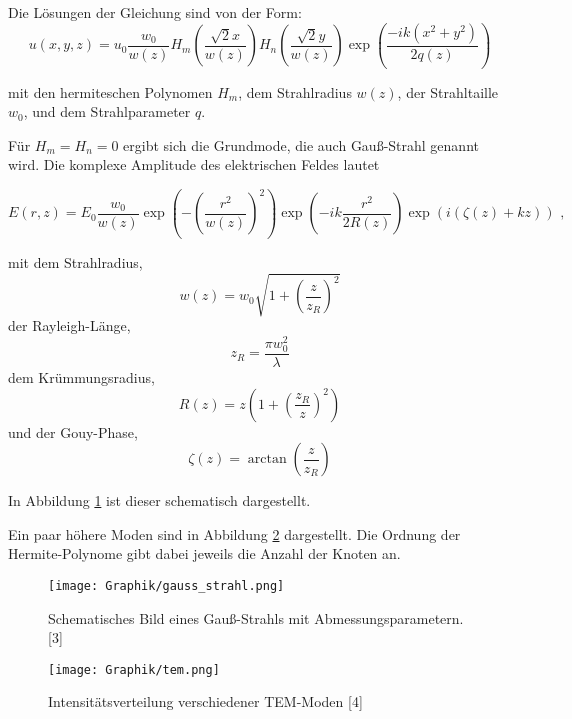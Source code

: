 \documentclass[10pt,twoside]{article}
\renewcommand{\1}{^{-1}}
\renewcommand{\2}{^{-2}}
\newcommand{\3}{^{-3}}
\newcommand{\4}{^{-4}}
\newcommand{\5}{^{-5}}
\newcommand{\6}{^{-6}}
\newcommand{\7}{^{-7}}
\newcommand{\8}{^{-8}}
\newcommand{\9}{^{-9}}
\begin{document}
Die Lösungen der Gleichung sind von der Form:
\begin{equation}
u(x,y,z)=u_0 \frac{w_0}{w(z)} H_m \left( \frac{\sqrt{2}x}{w(z)} \right) H_n \left( \frac{\sqrt{2}y}{w(z)} \right) \exp \left( \frac{-ik(x^2+y^2)}{2q(z)} \right)
\end{equation}

mit den hermiteschen Polynomen $H_m$, dem Strahlradius $w(z)$, der Strahltaille $w_0$, und dem Strahlparameter $q$.

Für $H_m = H_n = 0$ ergibt sich die Grundmode, die auch Gauß-Strahl genannt wird.
Die komplexe Amplitude des elektrischen Feldes lautet

\begin{equation}
E(r,z)= E_0 \frac{w_0}{w(z)} \exp \left( -\left(\frac{r^2}{w(z)} \right) ^2 \right) \exp \left( -ik \frac{r^2}{2R(z)} \right) \exp \left( i( \zeta (z) + kz ) \right) \, \, ,
\end{equation}

mit dem Strahlradius,
\begin{equation}
w(z)= w_0 \sqrt{1+ \left( \frac{z}{z_R} \right) ^2}
\end{equation}
der Rayleigh-Länge,
\begin{equation}
z_R=\frac{\pi w_0^2}{\lambda}
\end{equation}
dem Krümmungsradius,
\begin{equation}
R(z)=z \left( 1 +\left( \frac{z_R}{z} \right) ^2 \right)
\end{equation}
und der Gouy-Phase,
\begin{equation}
\zeta(z) = \arctan \left( \frac{z}{z_R} \right)
\end{equation}

In Abbildung \ref{fig:gauss} ist dieser schematisch dargestellt.


Ein paar höhere Moden sind in Abbildung \ref{fig:tem} dargestellt. Die Ordnung der Hermite-Polynome gibt dabei jeweils die Anzahl der Knoten an.

\begin{figure}
\centering
\texttt{[image: Graphik/gauss\_strahl.png]} 
\caption{Schematisches Bild eines Gauß-Strahls mit Abmessungsparametern. [3]}
\label{fig:gauss}
\end{figure}

\begin{figure}
\centering
\texttt{[image: Graphik/tem.png]} 
\caption{Intensitätsverteilung verschiedener TEM-Moden [4] }
\label{fig:tem}
\end{figure}
\end{document}
